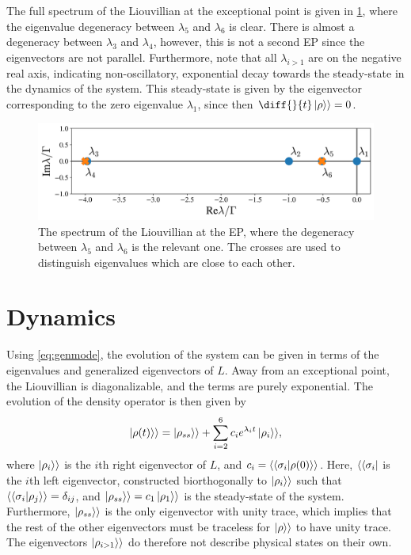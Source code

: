 \documentclass[../main.tex]{subfiles}
\begin{document}
The full spectrum of the Liouvillian at the exceptional point is given in \cref{fig:spec}, where the eigenvalue degeneracy between $\lambda_5$ and $\lambda_6$ is clear. There is almost a degeneracy between $\lambda_3$ and $\lambda_4$, however, this is not a second EP since the eigenvectors are not parallel. Furthermore, note that all $\lambda_{i>1}$ are on the negative real axis, indicating non-oscillatory, exponential decay towards the steady-state in the dynamics of the system. This steady-state is given by the eigenvector corresponding to the zero eigenvalue $\lambda_1$, since then $\diff{}{t}\ket{\rho}\rangle = 0$.
\begin{figure}[H]
    \centering
    \includegraphics[width=0.8\linewidth]{figures/spectrum.png}
    \caption{The spectrum of the Liouvillian at the EP, where the degeneracy between $\lambda_5$ and $\lambda_6$ is the relevant one. The crosses are used to distinguish eigenvalues which are close to each other.}
    \label{fig:spec}
\end{figure}

\section{Dynamics}

Using \cref{eq:genmode}, the evolution of the system can be given in terms of the eigenvalues and generalized eigenvectors of $L$. Away from an exceptional point, the Liouvillian is diagonalizable, and the terms are purely exponential. The evolution of the density operator is then given by
\begin{equation}\label{eq:dynnonep}
    \ket{\rho(t)}\rangle = \ket{\rho_{ss}}\rangle + \sum_{i=2}^6 c_i e^{\lambda_i t} \ket{\rho_i}\rangle,
\end{equation}
where $\ket{\rho_i}\rangle$ is the $i$th right eigenvector of $L$, and $c_i = \langle\braket{\sigma_i|\rho(0)}\rangle$. Here, $\langle\bra{\sigma_i}$ is the $i$th left eigenvector, constructed biorthogonally to $\ket{\rho_i}\rangle$ such that $\langle\braket{\sigma_i|\rho_j}\rangle = \delta_{ij}$, and $\ket{\rho_{ss}}\rangle = c_1 \ket{\rho_1}\rangle$ is the steady-state of the system. Furthermore, $\ket{\rho_{ss}}\rangle$ is the only eigenvector with unity trace, which implies that the rest of the other eigenvectors must be traceless for $\ket{\rho}\rangle$ to have unity trace. The eigenvectors $\ket{\rho_{i>1}}\rangle$ do therefore not describe physical states on their own.
\end{document}
